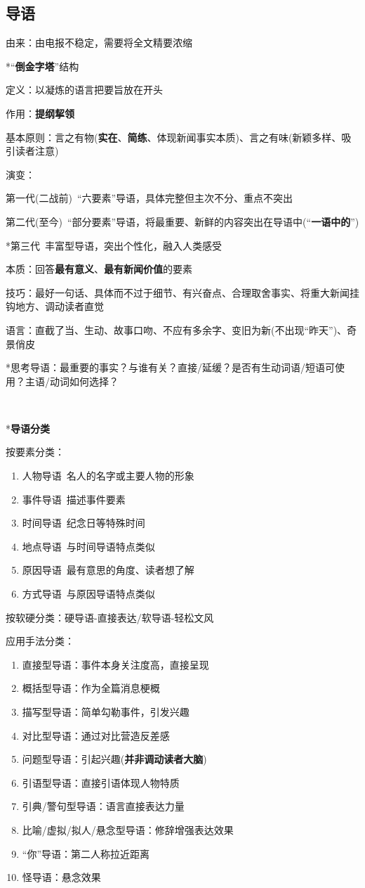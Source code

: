 \documentclass[a4paper,UTF8]{ctexart}
\begin{document}
\subsection{导语}
由来：由电报不稳定，需要将全文精要浓缩

*“\textbf{倒金字塔}”结构

定义：以凝炼的语言把要旨放在开头

作用：\textbf{提纲挈领}

基本原则：言之有物(\textbf{实在}、\textbf{简练}、体现新闻事实本质)、言之有味(新颖多样、吸引读者注意)

演变：

第一代(二战前)\ “六要素”导语，具体完整但主次不分、重点不突出

第二代(至今)\ “部分要素”导语，将最重要、新鲜的内容突出在导语中(“\textbf{一语中的}”)

*第三代\ 丰富型导语，突出个性化，融入人类感受

本质：回答\textbf{最有意义}、\textbf{最有新闻价值}的要素

技巧：最好一句话、具体而不过于细节、有兴奋点、合理取舍事实、将重大新闻挂钩地方、调动读者直觉

语言：直截了当、生动、故事口吻、不应有多余字、变旧为新(不出现“昨天”)、奇景俏皮

*思考导语：最重要的事实？与谁有关？直接/延缓？是否有生动词语/短语可使用？主语/动词如何选择？

~

*\textbf{导语分类}

按要素分类：
\begin{enumerate}
	\item 人物导语\ 名人的名字或主要人物的形象
	\item 事件导语\ 描述事件要素
	\item 时间导语\ 纪念日等特殊时间
	\item 地点导语\ 与时间导语特点类似
	\item 原因导语\ 最有意思的角度、读者想了解
	\item 方式导语\ 与原因导语特点类似
\end{enumerate}

按软硬分类：硬导语-直接表达/软导语-轻松文风

应用手法分类：
\begin{enumerate}
	\item 直接型导语：事件本身关注度高，直接呈现
	\item 概括型导语：作为全篇消息梗概
	\item 描写型导语：简单勾勒事件，引发兴趣
	\item 对比型导语：通过对比营造反差感
	\item 问题型导语：引起兴趣(\textbf{并非调动读者大脑})
	\item 引语型导语：直接引语体现人物特质
	\item 引典/警句型导语：语言直接表达力量
	\item 比喻/虚拟/拟人/悬念型导语：修辞增强表达效果
	\item “你”导语：第二人称拉近距离
	\item 怪导语：悬念效果
\end{enumerate}
\end{document}
